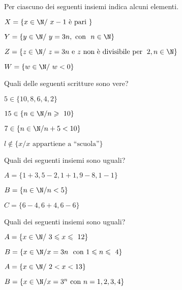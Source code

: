 \begin{esercizio}
\label{ese:6.29}
Per ciascuno dei seguenti insiemi indica alcuni elementi.
\TabPositions{6cm}
\begin{enumeratea}
\item \(X=\{x\in\N/\ x-1\text{ è pari }\}\)\dotfill
\item \(Y=\{y\in\N/\ y=3n,\text{ con }\ n\in\N\}\)\dotfill
\item \(Z=\{z\in\N/\ z=3n\text{ e } z\text{ non è divisibile per 
}\;2,n\in\N\}\)\dotfill
\item \(W=\{w\in\N/\ w<0\}\)\dotfill
\end{enumeratea}
\end{esercizio}

\newpage %

\begin{esercizio}
\label{ese:6.30}
Quali delle seguenti scritture sono vere?
\begin{multicols}{2}
\begin{enumeratea}
\item \(5\in \{10,8,6,4,2\}\)\hfill\boxV\quad\boxF
\item \(15\in \{n\in\N/n\geqslant~10\}\)\hfill\boxV\quad\boxF
\item \(7\in \{n\in\N/n+5<10\}\)\hfill\boxV\quad\boxF
\item \(l\notin\{x/x\text{ appartiene a ``scuola''}\}\)\hfill\boxV\quad\boxF
\end{enumeratea}
\end{multicols}
\end{esercizio}

\begin{esercizio}
\label{ese:6.31}
Quali dei seguenti insiemi sono uguali?
\begin{multicols}{2}
 \begin{enumeratea}
 \item \(A=\{1+3, 5-2, 1+1, 9-8, 1-1\}\)
\item \(B=\{n\in\N/n<5\}\)
\item \(C=\{6-4, 6+4, 6-6\}\)
 \end{enumeratea}
\end{multicols}
\end{esercizio}


\begin{esercizio}
\label{ese:6.32}
Quali dei seguenti insiemi sono uguali?
\begin{multicols}{2}
\begin{enumeratea}
\item \(A=\{x\in\N/\ 3\leqslant x\leqslant~12\}\)
\item \(B=\{x\in\N/x=3n\ \text{ con } 1\leqslant n\leqslant~4\}\)
\item \(A=\{x\in\N/\ 2<x<13\}\)
\item \(B=\{x\in\N/x=3^{n}\text{ con }n=1,2,3,4\}\)
\end{enumeratea}
\end{multicols}
\end{esercizio}

